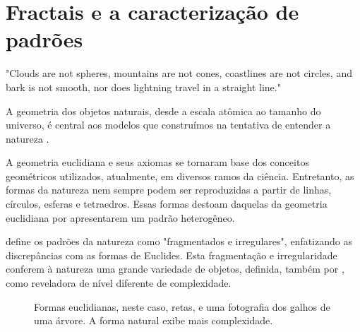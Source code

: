 \documentclass{ufscThesis}
\begin{document}
\section{Fractais e a caracterização de padrões}
\epigraph{"Clouds are not spheres, mountains are not cones, coastlines are not circles, and bark is not smooth, nor does lightning travel in a straight line."}{}

A geometria dos objetos naturais, desde a escala atômica ao tamanho do universo, é central aos modelos que construímos na tentativa de entender a natureza \cite[p.~1]{feder1988fractals}. \par
A geometria euclidiana e seus axiomas se tornaram base dos conceitos geométricos utilizados, atualmente, em diversos ramos da ciência. Entretanto, as formas da natureza nem sempre podem ser reproduzidas a partir de linhas, círculos, esferas e tetraedros. Essas formas destoam daquelas da geometria euclidiana por apresentarem um padrão heterogêneo.\par 
{} define os padrões da natureza como "fragmentados e irregulares", enfatizando as discrepâncias com as formas de Euclides. Esta fragmentação e irregularidade conferem à natureza uma grande variedade de objetos, definida, também por , como reveladora de nível diferente de complexidade. \par

\begin{figure}[!h]

\center
{}
\quad
{}
\caption{Formas euclidianas, neste caso, retas, e uma fotografia dos galhos de uma árvore. A forma natural exibe mais complexidade.}

\end{figure}
\end{document}
